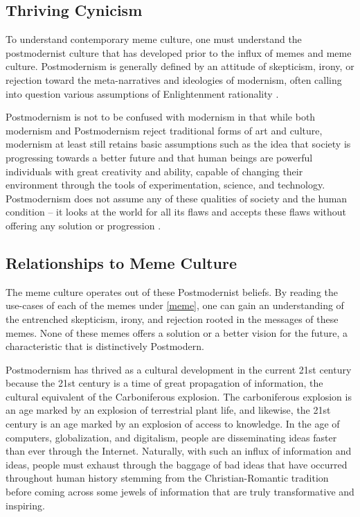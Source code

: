 \documentclass[12pt,letterpaper]{article}
\begin{document}
\subsection{Thriving Cynicism}

To understand contemporary meme culture, one must understand the postmodernist culture that has developed prior to the influx of memes and meme culture.  Postmodernism is generally defined by an attitude of skepticism, irony, or rejection toward the meta-narratives and ideologies of modernism, often calling into question various assumptions of Enlightenment rationality \cite{noauthor_postmodernism_2019}.  

Postmodernism is not to be confused with modernism in that while both modernism and Postmodernism reject traditional forms of art and culture, modernism at least still retains basic assumptions such as the idea that society is progressing towards a better future and that human beings are powerful individuals with great creativity and ability, capable of changing their environment through the tools of experimentation, science, and technology.  Postmodernism does not assume any of these qualities of society and the human condition -- it looks at the world for all its flaws and accepts these flaws without offering any solution or progression \cite{noauthor_postmodernism_nodate}.

\subsection{Relationships to Meme Culture}

The meme culture operates out of these Postmodernist beliefs.  By reading the use-cases of each of the memes under \autoref{meme}, one can gain an understanding of the entrenched skepticism, irony, and rejection rooted in the messages of these memes.  None of these memes offers a solution or a better vision for the future, a characteristic that is distinctively Postmodern.

Postmodernism has thrived as a cultural development in the current 21st century because the 21st century is a time of great propagation of information, the cultural equivalent of the Carboniferous explosion.  The carboniferous explosion is an age marked by an explosion of terrestrial  plant life, and likewise, the 21st century is an age marked by an explosion of access to knowledge.  In the age of computers,  globalization, and digitalism, people are disseminating ideas faster than ever through the Internet.  Naturally,  with such an influx of information and ideas, people must exhaust through the baggage of bad ideas that have occurred throughout human history stemming from the Christian-Romantic tradition before coming across some jewels of information that are truly transformative and inspiring.
\end{document}
